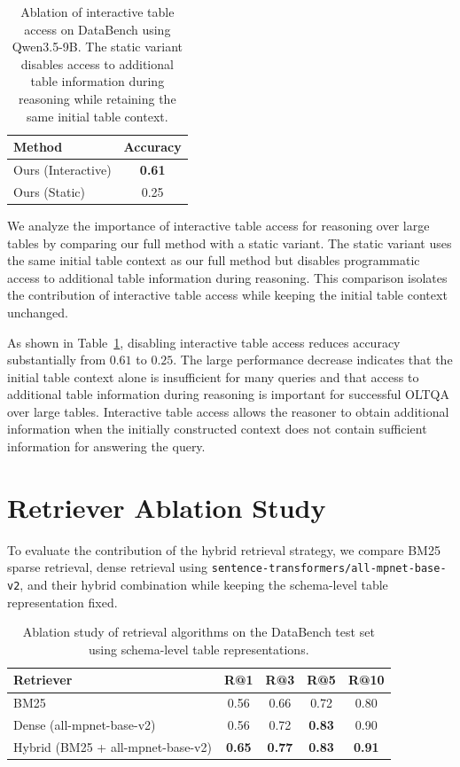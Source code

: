 \begin{table}[t]
\centering
\small
\begin{tabular}{lc}
\hline
\textbf{Method} & \textbf{Accuracy} \\
\hline
Ours (Interactive) & \textbf{0.61} \\
Ours (Static)      & 0.25 \\
\hline
\end{tabular}
\caption{Ablation of interactive table access on DataBench using Qwen3.5-9B. The static variant disables access to additional table information during reasoning while retaining the same initial table context.}
\label{tab:interactive_ablation}
\end{table}

We analyze the importance of interactive table access for reasoning over large tables by comparing our full method with a static variant.
The static variant uses the same initial table context as our full method but disables programmatic access to additional table information during reasoning.
This comparison isolates the contribution of interactive table access while keeping the initial table context unchanged.

As shown in Table~\ref{tab:interactive_ablation}, disabling interactive table access reduces accuracy substantially from $0.61$ to $0.25$.
The large performance decrease indicates that the initial table context alone is insufficient for many queries and that access to additional table information during reasoning is important for successful OLTQA over large tables.
Interactive table access allows the reasoner to obtain additional information when the initially constructed context does not contain sufficient information for answering the query.


\section{Retriever Ablation Study}
\label{sec:retriever_ablation}

To evaluate the contribution of the hybrid retrieval strategy, we compare BM25 sparse retrieval, dense retrieval using \texttt{sentence-transformers/all-mpnet-base-v2}, and their hybrid combination while keeping the schema-level table representation fixed.

\begin{table}[t]
\centering
\caption{Ablation study of retrieval algorithms on the DataBench test set using schema-level table representations.}
\label{tab:retriever_ablation}
\begin{tabular}{lcccc}
\toprule
\textbf{Retriever} &
\textbf{R@1} &
\textbf{R@3} &
\textbf{R@5} &
\textbf{R@10} \\
\midrule
BM25
& 0.56 & 0.66 & 0.72 & 0.80 \\
Dense (all-mpnet-base-v2)
& 0.56 & 0.72 & \textbf{0.83} & 0.90 \\
Hybrid (BM25 + all-mpnet-base-v2)
& \textbf{0.65} & \textbf{0.77} & \textbf{0.83} & \textbf{0.91} \\
\bottomrule
\end{tabular}
\end{table}

